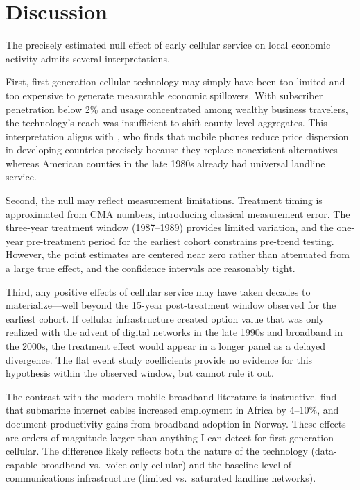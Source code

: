 \documentclass[12pt]{article}
\begin{document}


\section{Discussion}

The precisely estimated null effect of early cellular service on local economic activity admits several interpretations.

First, first-generation cellular technology may simply have been too limited and too expensive to generate measurable economic spillovers. With subscriber penetration below 2\% and usage concentrated among wealthy business travelers, the technology's reach was insufficient to shift county-level aggregates. This interpretation aligns with \citet{aker2010}, who finds that mobile phones reduce price dispersion in developing countries precisely because they replace nonexistent alternatives---whereas American counties in the late 1980s already had universal landline service.

Second, the null may reflect measurement limitations. Treatment timing is approximated from CMA numbers, introducing classical measurement error. The three-year treatment window (1987--1989) provides limited variation, and the one-year pre-treatment period for the earliest cohort constrains pre-trend testing. However, the point estimates are centered near zero rather than attenuated from a large true effect, and the confidence intervals are reasonably tight.

Third, any positive effects of cellular service may have taken decades to materialize---well beyond the 15-year post-treatment window observed for the earliest cohort. If cellular infrastructure created option value that was only realized with the advent of digital networks in the late 1990s and broadband in the 2000s, the treatment effect would appear in a longer panel as a delayed divergence. The flat event study coefficients provide no evidence for this hypothesis within the observed window, but cannot rule it out.

The contrast with the modern mobile broadband literature is instructive. \citet{hjort2019} find that submarine internet cables increased employment in Africa by 4--10\%, and \citet{akerman2015} document productivity gains from broadband adoption in Norway. These effects are orders of magnitude larger than anything I can detect for first-generation cellular. The difference likely reflects both the nature of the technology (data-capable broadband vs.\ voice-only cellular) and the baseline level of communications infrastructure (limited vs.\ saturated landline networks).
\end{document}
